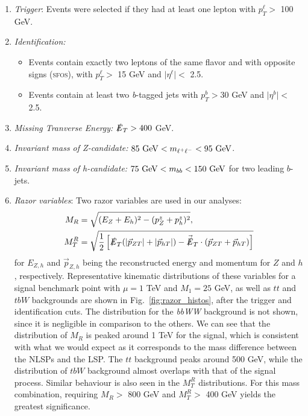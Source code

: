 \documentclass[a4paper,11pt]{article}
\providecommand{\tightlist}{%
     \setlength{\itemsep}{0pt}\setlength{\parskip}{0pt}}
\newcommand{\met}{{\slashed{E}_T}}
\begin{document}
\begin{enumerate}
  \tightlist
  \item \emph{Trigger}: Events were selected if they had at least one lepton
    with $p_{T}^\ell >$ 100 GeV. 

  \item \emph{Identification:}

    \begin{itemize}
      \item Events contain exactly two leptons of the same flavor
        and with opposite signs (\textsc{sfos}), with $p_{T}^\ell >$ 15 GeV and
        $\vert\eta^\ell\vert <$ 2.5.
      \item Events contain at least two \emph{b}-tagged jets with
        $p_{T}^b > 30$ GeV and $\vert\eta^b\vert <$ 2.5.
    \end{itemize}

   \item \emph{Missing Tranverse Energy:}  $\met> 400$ GeV.

 \item \emph{Invariant mass of Z-candidate:}  $85\ {\rm GeV}<m_{\ell^{+}\ell^{-}}<95\ {\rm GeV}$.

  \item \emph{Invariant mass of h-candidate:} $75\ {\rm GeV}<m_{bb}<150\ {\rm GeV}$ for two leading $b$-jets.


  \item \emph{Razor variables}:  Two razor variables are used in our analyses: 
\begin{align}
M_R &= \sqrt{(E_Z+E_h)^2 - (p_Z^z + p_h^z)^2},\\
M_T^R &= \sqrt{\frac{1}{2}\left[\slashed{E}_T(|\vec{p}_{ZT}|+|\vec{p}_{hT}|)
- \vec{\slashed{E}}_T\cdot(\vec{p}_{ZT}+\vec{p}_{hT})\right]}
\end{align}
 for $E_{Z,h}$ and $\vec{p}_{Z,h}$ being the reconstructed energy and momentum for $Z$ and $h$, respectively.
      Representative kinematic
  distributions of these variables for a signal benchmark point with $\mu=1$ TeV and $M_1=25$ GeV, as well as $tt$ and $tbW$ backgrounds are
  shown in Fig.~\ref{fig:razor_histos}, after the trigger and identification cuts.
  The distribution for the \emph{bbWW} background is not shown, since it is negligible in
  comparison to the others.   We can see that the distribution of $M_R$ is peaked
  around 1 TeV for the signal, which is consistent with what we would expect as
  it corresponds to the mass difference between the NLSPs and the LSP.  The $tt$
  background peaks around 500 GeV, while the distribution of $tbW$ background
  almost overlaps with that of the signal process.
  Similar behaviour is also seen in the $M_T^R$ distributions.  
  For this mass combination, requiring $M_R >$ 800
  GeV and $M_T^R >$ 400 GeV yields the greatest significance.

\end{enumerate}
\end{document}
